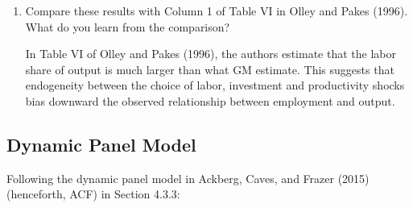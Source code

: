 \documentclass{article}
\begin{document}
\begin{enumerate}
\item Compare these results with Column 1 of Table VI in Olley and Pakes (1996).
What do you learn from the comparison?

\begin{answer}
In Table VI of Olley and Pakes (1996), the authors estimate that the labor share of output is much larger than what GM estimate. This suggests that endogeneity between the choice of labor, investment and productivity shocks bias downward the observed relationship between employment and output.
\end{answer}

\end{enumerate}

\subsection{Dynamic Panel Model}
Following the dynamic panel model in Ackberg, Caves, and Frazer (2015) (henceforth, ACF) in Section 4.3.3:
\end{document}
